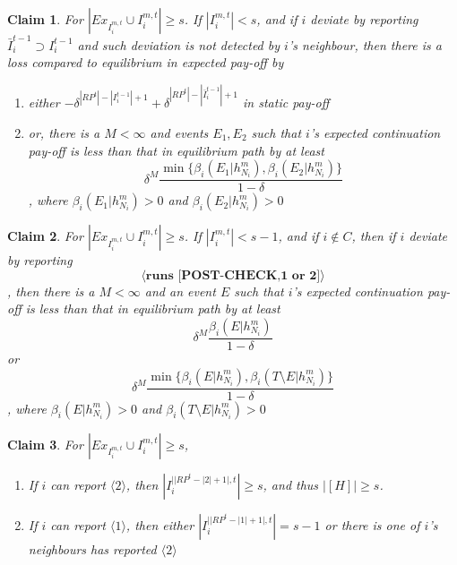 \documentclass[12pt]{article}
\newtheorem{claim}{Claim}[subsubsection]
\theoremstyle{remark}
\theoremstyle{remark}
\begin{document}
\begin{claim} 
\label{claim_deviation_higher_reporting}
For $|Ex_{I^{m,t}_i}\cup I^{m,t}_i|\geq s$. If $|I^{m,t}_i|<s$, and if $i$ deviate by reporting $\bar{I}^{t-1}_i\supset I^{t-1}_i$ and such deviation is not detected by $i$'s neighbour, then there is a loss compared to equilibrium in expected pay-off by
\begin{enumerate}
\item either $-\delta^{|RP^t|-|I^{t-1}_i|+1}+\delta^{|RP^t|-|\bar{I}^{t-1}_i|+1}$ in static pay-off
\item or, there is a $M<\infty$ and events $E_1,E_2$ such that $i$'s expected continuation pay-off is less than that in equilibrium path by at least 
\[\delta^{M}\frac{\min\{\beta_{i}(E_1|h^{m}_{N_i}),\beta_{i}(E_2|h^{m}_{N_i})\}}{1-\delta}\]
, where $\beta_{i}(E_1|h^{m}_{N_i})>0$ and $\beta_{i}(E_2|h^{m}_{N_i})>0$
\end{enumerate}



\end{claim}




\begin{claim} 
\label{claim_can_not_pretend_almost_success}
For $|Ex_{I^{m,t}_i}\cup I^{m,t}_i|\geq s$. If $|I^{m,t}_i|<s-1$, and if $i\notin C$, then if $i$ deviate by reporting \[\langle\textbf{runs [POST-CHECK,1 or 2]}\rangle\]
, then there is a $M<\infty$ and an event $E$ such that $i$'s expected continuation pay-off is less than that in equilibrium path by at least 
\[\delta^{M}\frac{\beta_{i}(E|h^{m}_{N_i})}{1-\delta}\]
or
\[\delta^{M}\frac{\min\{\beta_{i}(E|h^{m}_{N_i}),\beta_{i}(T\setminus E|h^{m}_{N_i})\}}{1-\delta}\]
, where $\beta_{i}(E|h^{m}_{N_i})>0$ and $\beta_{i}(T\setminus E|h^{m}_{N_i})>0$
\end{claim}




\begin{claim}
\label{claim_almost_sucess}
For $|Ex_{I^{m,t}_i}\cup I^{m,t}_i|\geq s$, 
\begin{enumerate}
\item If $i$ can report $\langle 2 \rangle$, then $|I^{||RP^t-|2|+1|,t}_i|\geq s$, and thus $|[H]|\geq s$. 
\item If $i$ can report $\langle 1 \rangle$, then either $|I^{||RP^t-|1|+1|,t}_i|= s-1$ or there is one of $i$'s neighbours has reported $\langle 2 \rangle$
\end{enumerate}

\end{claim}
\end{document}
